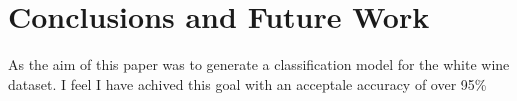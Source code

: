 \section{Conclusions and Future Work}

As the aim of this paper was to generate a classification model for the white wine dataset. I feel I have achived this goal with an acceptale accuracy of over 95\%



